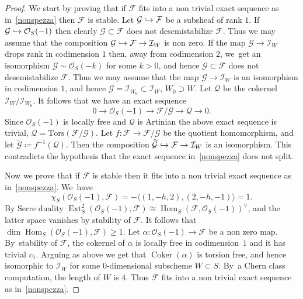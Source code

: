 \documentclass[JEP,XML,SOM,Unicode,published]{cedram}
\newcommand\hto{\mathrel{\lhook\joinrel\to}}
\newcommand\cF{\mathcal{F}}
\newcommand\cG{\mathcal{G}}
\newcommand\cI{\mathcal{I}}
\newcommand\cO{\mathcal{O}}
\newcommand\cQ{\mathcal{Q}}
\DeclareMathOperator{\coker}{Coker}
\DeclareMathOperator{\Ext}{Ext}
\DeclareMathOperator{\Hom}{Hom}
\let\hra\hto
\let\la\langle
\let\wt\widetilde
\theoremstyle{definition}
\begin{document}
\begin{proof}
We start by proving that if $\cF$ fits into a non trivial exact sequence as in~\eqref{nonspezza} then $\cF$ is stable. Let $\cG\hra\cF$ be a subsheaf of rank $1$. If
$\cG\hra\cO_S(-1)$ then clearly $\cG\subset\cF$ does not desemistabilize $\cF$. Thus we may assume that the composition
$\cG\hra\cF\to \cI_W$ is non zero. If the map $\cG\to \cI_W$ drops rank in codimension $1$ then, away from codimension $2$, we~get an isomorphism $\cG\sim\cO_S(-k)$ for some $k>0$, and hence $\cG\subset\cF$ does not desemistabilize $\cF$. Thus we may assume that the map $\cG\to \cI_W$ is an isomorphism in codimension $1$, and hence $\cG=\cI_{W_0}\subset \cI_W$, \ie $W_0\supset W$. Let $\cQ$ be the cokernel $\cI_W/ \cI_{W_0}$. It follows that we have an exact sequence
\begin{equation*}
0\to\cO_S(-1)\to\cF/\cG\to \cQ\to 0.
\end{equation*}
Since $\cO_S(-1)$ is locally free and $\cQ$ is Artinian the above exact sequence is trivial, \ie $\cQ=\mathrm{Tors}(\cF/\cG)$. Let $f\colon\cF\to \cF/\cG$ be the quotient homomorphism, and let $\wt{\cG}\coloneqq f^{-1}(\cQ)$. Then the composition
$\wt{\cG}\hra\cF\to \cI_W$ is an isomorphism. This contradicts the hypothesis that the exact sequence in~\eqref{nonspezza} does not split.

Now we prove that if $\cF$ is stable then it fits into a non trivial exact sequence as in~\eqref{nonspezza}. We~have
\begin{equation*}
\chi_S(\cO_S(-1),\cF)=-\la (1,-h,2),(2,-h,-1)\rangle=1.
\end{equation*}
By Serre duality $\Ext^2_S(\cO_S(-1),\cF)\cong \Hom_S(\cF,\cO_S(-1))^{\vee}$, and the latter space vanishes by stability of $\cF$. It follows that
$\dim\Hom_S(\cO_S(-1),\cF)\ge 1$.
Let $\alpha\colon\cO_S(-1)\to\cF$ be a non zero map. By~stability of $\cF$, the
cokernel of $\alpha$ is locally free in codimension~$1$ and it has trivial $c_1$. Arguing as above we get that $\coker(\alpha)$ is torsion free, and hence isomorphic to $\cI_{W}$ for some $0$-dimensional subscheme $W\subset S$. By~a Chern class computation, the length of $W$ is $4$. Thus $\cF$
fits into a non trivial exact sequence as in~\eqref{nonspezza}.
\end{proof}
\end{document}
